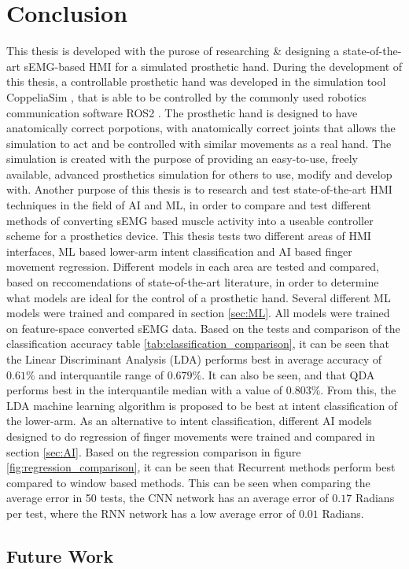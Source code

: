 \documentclass[../main.tex]{subfiles}
\begin{document}
\section{Conclusion}

This thesis is developed with the purose of researching \& designing a state-of-the-art sEMG-based HMI for a simulated prosthetic hand.
During the development of this thesis, a controllable prosthetic hand was developed in the simulation tool CoppeliaSim \cite{coppeliasim}, that is able to be controlled by the commonly used robotics communication software ROS2 \cite{ros2}.
The prosthetic hand is designed to have anatomically correct porpotions, with anatomically correct joints that allows the simulation to act and be controlled with similar movements as a real hand. 
The simulation is created with the purpose of providing an easy-to-use, freely available, advanced prosthetics simulation for others to use, modify and develop with. 
Another purpose of this thesis is to research and test state-of-the-art HMI techniques in the field of AI and ML, in order to compare and test different methods of converting sEMG based muscle activity into a useable controller scheme for a prosthetics device.
This thesis tests two different areas of HMI interfaces, ML based lower-arm intent classification and AI based finger movement regression.
Different models in each area are tested and compared, based on reccomendations of state-of-the-art
literature, in order to determine what models are ideal for the control of a prosthetic hand.
Several different ML models were trained and compared in section \ref{sec:ML}.
All models were trained on feature-space converted sEMG data.
Based on the tests and comparison of the classification accuracy table \ref{tab:classification_comparison}, it can be seen that the Linear Discriminant Analysis (LDA) performs best in average accuracy of $0.61\%$ and interquantile range of $0.679\%$.
It can also be seen, and that QDA performs best in the interquantile median with a value of $0.803\%$.
From this, the LDA machine learning algorithm is proposed to be best at intent classification of the lower-arm.
As an alternative to intent classification, different AI models designed to do regression of finger movements were trained and compared in section \ref{sec:AI}.
Based on the regression comparison in figure \ref{fig:regression_comparison}, it can be seen that Recurrent methods perform best compared to window based methods.
This can be seen when comparing the average error in 50 tests, the CNN network has an average error of $0.17$ Radians per test, where the RNN network has a low average error of $0.01$ Radians.




\subsection{Future Work}
\end{document}
